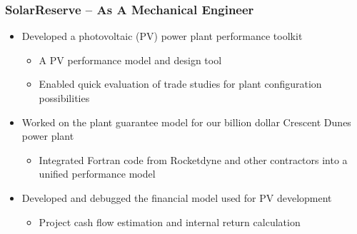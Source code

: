 \documentclass[aspectratio=169]{beamer}
\begin{document}
\begin{frame}
  \frametitle{SolarReserve -- As A Mechanical Engineer}
  \begin{itemize}
  \item Developed a photovoltaic (PV) power plant performance toolkit
    \begin{itemize}
    \item A PV performance model and design tool
    \item Enabled quick evaluation of trade studies for plant
      configuration possibilities
    \end{itemize}
  \item Worked on the plant guarantee model for our billion dollar
    Crescent Dunes power plant
    \begin{itemize}
    \item Integrated Fortran code from Rocketdyne and other
      contractors into a unified performance model
    \end{itemize}
  \item Developed and debugged the financial model used for PV
    development
    \begin{itemize}
    \item Project cash flow estimation and internal return calculation
    \end{itemize}
  \end{itemize}
\end{frame}
\end{document}
